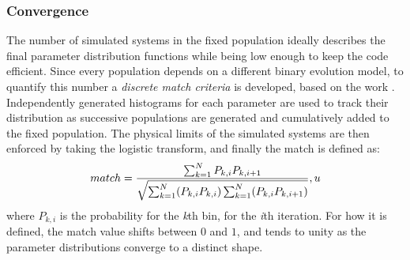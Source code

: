 \subsubsection{Convergence}
The number of simulated systems in the fixed population ideally describes the final parameter distribution functions while being low enough to keep the code efficient. 
Since every population depends on a different binary evolution model, to quantify this number a \textit{discrete match criteria} is developed, based on the work \cite{Chatziioannou17}.
Independently generated histograms for each parameter are used to track their distribution as successive populations are generated and cumulatively added to the fixed population.
The physical limits of the simulated systems are then enforced by taking the logistic transform, and finally the match is defined as: 
\begin{equation}
    match=\displaystyle\frac{\sum_{k=1}^{N}P_{k,i} P_{k,i+1}}{\sqrt{\sum_{k=1}^{N}(P_{k,i}P_{k,i})\sum_{k=1}^{N}(P_{k,i}P_{k,i+1})}},
    \label{eq: match condition}
    \notag
u\end{equation}
where $P_{k,i}$ is the probability for the \textit{k}th bin, for the \textit{i}th iteration.
For how it is defined, the match value shifts between $0$ and $1$, and tends to unity as the parameter distributions converge to a distinct shape.


